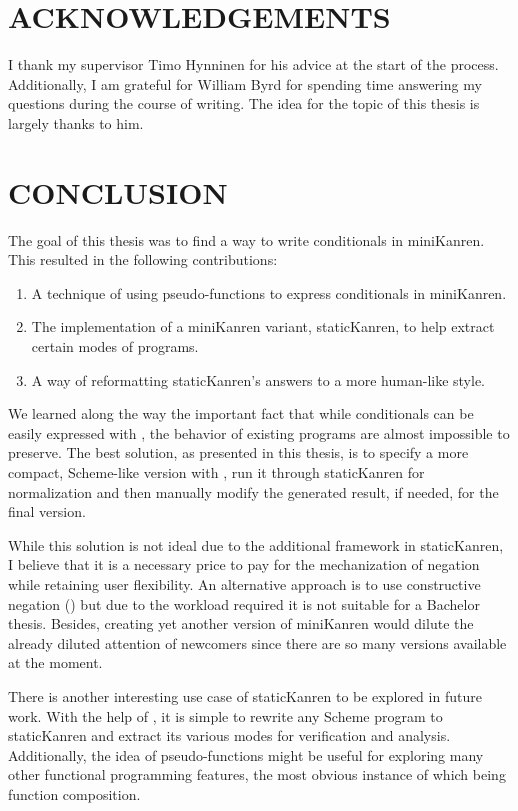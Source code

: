 \section{ACKNOWLEDGEMENTS}
I thank my supervisor Timo Hynninen for his advice at the start of the process. Additionally, I am grateful for William Byrd for spending time answering my questions during the course of writing. The idea for the topic of this thesis is largely thanks to him.

\section{CONCLUSION}
\ifthesis
The goal of this thesis was to find a way to write conditionals in miniKanren. This resulted in the following contributions:
\begin{enumerate}
\item A technique of using pseudo-functions to express conditionals in miniKanren.
\item The implementation of a miniKanren variant, staticKanren, to help extract certain modes of programs.
\item A way of reformatting staticKanren's answers to a more human-like style.
\end{enumerate}

We learned along the way the important fact that while conditionals can be easily expressed with , the behavior of existing programs are almost impossible to preserve. The best solution, as presented in this thesis, is to specify a more compact, Scheme-like version with , run it through staticKanren for normalization and then manually modify the generated result, if needed, for the final version.

While this solution is not ideal due to the additional framework in staticKanren, I believe that it is a necessary price to pay for the mechanization of negation while retaining user flexibility. An alternative approach is to use constructive negation (\cite{chan}) but due to the workload required it is not suitable for a Bachelor thesis. Besides, creating yet another version of miniKanren would dilute the already diluted attention of newcomers since there are so many versions available at the moment.

There is another interesting use case of staticKanren to be explored in future work. With the help of , it is simple to rewrite any Scheme program to staticKanren and extract its various modes for verification and analysis. Additionally, the idea of pseudo-functions might be useful for exploring many other functional programming features, the most obvious instance of which being function composition.







